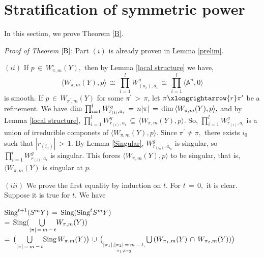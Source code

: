 \documentclass[12pt,reqno]{amsart}
\theoremstyle{definition}
\numberwithin{equation}{section}
\begin{document}
\section{Stratification of symmetric power}
In this section, we prove Theorem \ref{B}.

\textit{Proof of Theorem $\ref{B}$}:
   Part $(i)$ is already proven in Lemma \ref{prelim}.
    
$(ii)$  If $ p\,\in\, W_{\pi,m}^{\circ}(Y),$ then by Lemma \ref{local structure} we have, $$ \langle W_{\pi,m}(Y),p \rangle \,\cong\, \prod_{i=1}^{l} W_{(a_{i}),a_{i}}^{g} \,\cong\, \prod_{i=1}^{l} \langle \mathbb{A}^n, 0 \rangle $$  
     is smooth. If $ p \,\in\, W_{\pi^{\prime},m}(Y)$ for some $ \pi^{\prime}\,>\,\pi $, let $ \pi \xlongrightarrow{r}\pi^{\prime}$  be a refinement. We have $ \textnormal{dim}\medspace \prod_{i=1}^{l} W_{r_{(i)},a_{i}}^{g}\,=\,n |\pi|\,=\, \textnormal{dim} \medspace \langle W_{\pi,m}(Y),p \rangle ,$ and by Lemma \ref{local structure}, $ \prod_{i=1}^{l}W_{r_{(i)}, a_{i}}^{g}\, \subseteq\, \langle W_{\pi,m}(Y), p \rangle.$
So, $ \prod_{i=1}^{l}W_{r_{(i)},a_{i}}^{g} $ is a union of irreducible componets of $ \langle W_{\pi,m}(Y),p \rangle.$ Since $ \pi^{\prime} \neq \pi,$ there exists $i_{0}$
 such that $ |r_{(i_{0})}|\,>\,1.$ By Lemma \ref{Singular}, $ W_{r_{(i_{0})},a_{i_{0}}}^{g}$ is singular, so $ \prod_{i=1}^{l}W_{r_{(i)},a_{i}}^{g}$ is singular. This forces $ \langle W_{\pi,m}(Y), p \rangle $ to be singular, that is, $\langle W_{\pi,m}(Y)$ is singular at $p$. 

 $(iii)$ We prove the first equality by induction on $t$. For $ t\,=\,0,$ it is clear. Suppose it is true for $t$. We have 
 
 
\hspace{17pt}$ \textnormal{Sing}^{t+1}(S^{m}Y)\,=\, \textnormal{Sing}(\textnormal{Sing}^{t}S^{m}Y)$\\
 
\hspace{87pt} $=\, \textnormal{Sing}( \underset{|\pi|\,=\, m\,-\,t}{\bigcup{}}W_{\pi,m}(Y) )$ \\

\hspace{87pt} $=\, \big(\underset{|\pi|\,=\, m\,-\,t}{\bigcup}\textnormal{Sing\,}W_{\pi,m}(Y)\big )\, \cup\, \big(\underset{\underset{\pi_{1}\neq \pi_{2}}{|\pi_{1}|,|\pi_{2}|\,=\, m\,-\,t,}{}}\,\bigcup\, (W_{\pi_{1},m}(Y)\, \cap\, W_{\pi_{2},m}(Y)) \big )$\\

 
 
\end{document}

